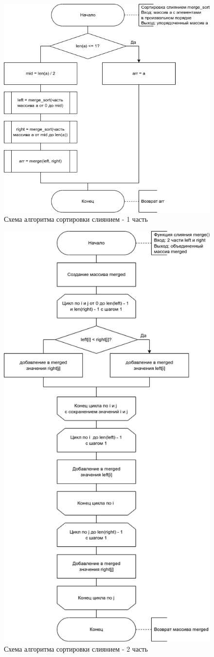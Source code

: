 \begin{figure}[h!]
	\centering
	\includegraphics[width=0.8\linewidth]{img/merge}
	\caption{Схема алгоритма сортировки слиянием - 1 часть}
	\label{fig:merge}
\end{figure}

\begin{figure}[h!]
	\centering
	\includegraphics[width=0.7\linewidth]{img/merge2}
	\caption{Схема алгоритма сортировки слиянием - 2 часть}
	\label{fig:merge2}
\end{figure}


